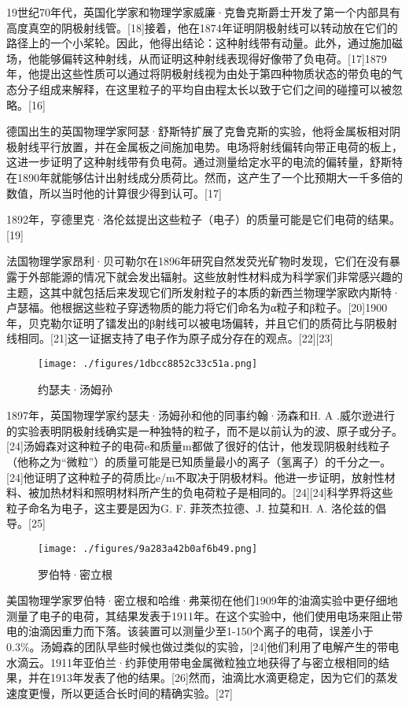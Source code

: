 19世纪70年代，英国化学家和物理学家威廉·克鲁克斯爵士开发了第一个内部具有高度真空的阴极射线管。[18]接着，他在1874年证明阴极射线可以转动放在它们的路径上的一个小桨轮。因此，他得出结论：这种射线带有动量。此外，通过施加磁场，他能够偏转这种射线，从而证明这种射线表现得好像带了负电荷。[17]1879年，他提出这些性质可以通过将阴极射线视为由处于第四种物质状态的带负电的气态分子组成来解释，在这里粒子的平均自由程太长以致于它们之间的碰撞可以被忽略。[16]

德国出生的英国物理学家阿瑟·舒斯特扩展了克鲁克斯的实验，他将金属板相对阴极射线平行放置，并在金属板之间施加电势。电场将射线偏转向带正电荷的板上，这进一步证明了这种射线带有负电荷。通过测量给定水平的电流的偏转量，舒斯特在1890年就能够估计出射线成分质荷比。然而，这产生了一个比预期大一千多倍的数值，所以当时他的计算很少得到认可。[17]

1892年，亨德里克·洛伦兹提出这些粒子（电子）的质量可能是它们电荷的结果。[19]

法国物理学家昂利·贝可勒尔在1896年研究自然发荧光矿物时发现，它们在没有暴露于外部能源的情况下就会发出辐射。这些放射性材料成为科学家们非常感兴趣的主题，这其中就包括后来发现它们所发射粒子的本质的新西兰物理学家欧内斯特·卢瑟福。他根据这些粒子穿透物质的能力将它们命名为α粒子和β粒子。[20]1900年，贝克勒尔证明了镭发出的β射线可以被电场偏转，并且它们的质荷比与阴极射线相同。[21]这一证据支持了电子作为原子成分存在的观点。[22][23]
\begin{figure}[ht]
\centering
\texttt{[image: ./figures/1dbcc8852c33c51a.png]}
\caption{约瑟夫·汤姆孙} \label{fig_DZ_1}
\end{figure}
1897年，英国物理学家约瑟夫·汤姆孙和他的同事约翰·汤森和H. A .威尔逊进行的实验表明阴极射线确实是一种独特的粒子，而不是以前认为的波、原子或分子。[24]汤姆森对这种粒子的电荷e和质量m都做了很好的估计，他发现阴极射线粒子（他称之为“微粒”）的质量可能是已知质量最小的离子（氢离子）的千分之一。[24]他证明了这种粒子的荷质比e/m不取决于阴极材料。他进一步证明，放射性材料、被加热材料和照明材料所产生的负电荷粒子是相同的。[24][24]科学界将这些粒子命名为电子，这主要是因为G. F. 菲茨杰拉德、J. 拉莫和H. A. 洛伦兹的倡导。[25]
\begin{figure}[ht]
\centering
\texttt{[image: ./figures/9a283a42b0af6b49.png]}
\caption{罗伯特·密立根} \label{fig_DZ_2}
\end{figure}
美国物理学家罗伯特·密立根和哈维·弗莱彻在他们1909年的油滴实验中更仔细地测量了电子的电荷，其结果发表于1911年。在这个实验中，他们使用电场来阻止带电的油滴因重力而下落。该装置可以测量少至1-150个离子的电荷，误差小于0.3\%。汤姆森的团队早些时候也做过类似的实验，[24]他们利用了电解产生的带电水滴云。1911年亚伯兰·约菲使用带电金属微粒独立地获得了与密立根相同的结果，并在1913年发表了他的结果。[26]然而，油滴比水滴更稳定，因为它们的蒸发速度更慢，所以更适合长时间的精确实验。[27]


